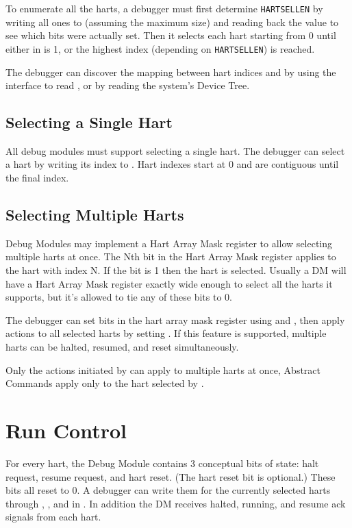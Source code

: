 To enumerate all the harts, a debugger must first determine {\tt HARTSELLEN}
by writing  all ones to \Fhartsel (assuming the maximum size) and reading back
the value to see which bits were actually set.  Then it selects each hart
starting from 0 until either \Fanynonexistent in \Rdmstatus is 1, or the
highest index (depending on {\tt HARTSELLEN}) is reached.

The debugger can discover the mapping between hart indices and
\Rmhartid by using the interface to read \Rmhartid, or by
reading the system's Device Tree.

\subsection {Selecting a Single Hart}

All debug modules must support selecting a single hart.
The debugger can select a hart by writing its index to \Fhartsel.
Hart indexes start at 0 and are contiguous until the final index.

\subsection {Selecting Multiple Harts} \label{hartarraymask}

Debug Modules may implement a Hart Array Mask register to allow selecting
multiple harts at once. The Nth bit in the Hart Array Mask register applies to
the hart with index N. If the bit is 1 then the hart is selected.  Usually a DM
will have a Hart Array Mask register exactly wide enough to select all the
harts it supports, but it's allowed to tie any of these bits to 0.

The debugger can set bits in the hart array mask register using \Rhawindowsel
and \Rhawindow, then apply actions to all selected harts by setting \Fhasel. If
this feature is supported, multiple harts can be halted, resumed, and reset
simultaneously.

Only the actions initiated by \Rdmcontrol can apply to multiple harts
at once, Abstract Commands apply only to the hart selected by
\Fhartsel.

\section{Run Control} \label{runcontrol}

For every hart, the Debug Module contains 3 conceptual bits of state: halt
request, resume request, and hart reset. (The hart reset bit is optional.)
These bits all reset to 0. A debugger can write them for the currently selected
harts through \Fhaltreq, \Fresumereq, and \Fhartreset in \Rdmcontrol. In
addition the DM receives halted, running, and resume ack signals from each
hart.

